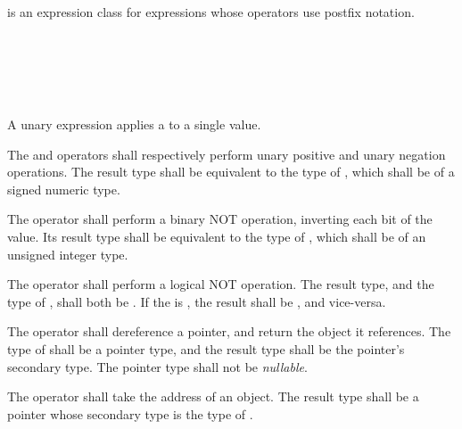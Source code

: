 \specsubsubitem
{} is an expression class for expressions whose
operators use postfix notation.


\begin{grammar}
 \\
	 \\
	  \\

 \oneof \\
	\terminal{+}
	\terminal{-}
	\terminal{\textasciitilde}
	\terminal{!}
	\terminal{*}
	\terminal{\&}
\end{grammar}


\specsubsubitem
A unary expression applies a  to a single value.

\specsubsubitem
The \terminal{+} and \terminal{-} operators shall respectively perform unary
positive and unary negation operations. The result type shall be equivalent to
the type of , which shall be of a signed numeric
type.

\specsubsubitem
The \terminal{\textasciitilde} operator shall perform a binary NOT operation,
inverting each bit of the value. Its result type shall be equivalent to the
type of , which shall be of an unsigned integer
type.

\specsubsubitem
The \terminal{!} operator shall perform a logical NOT operation. The result
type, and the type of , shall both be
. If the  is , the
result shall be , and vice-versa.

\specsubsubitem
The \terminal{*} operator shall dereference a pointer, and return the object it
references.  The type of  shall be a pointer
type, and the result type shall be the pointer's secondary type. The pointer
type shall not be \textit{nullable}.

\specsubsubitem
The \terminal{\&} operator shall take the address of an object. The result type
shall be a pointer whose secondary type is the type of
.


